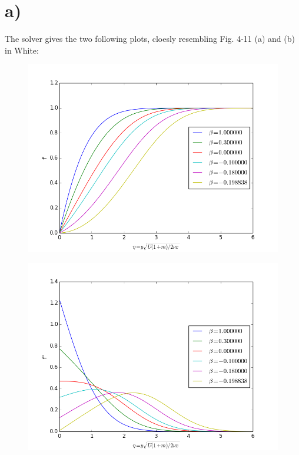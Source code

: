 \documentclass[a4paper,english,11pt,twoside]{article}
\begin{document}
\section*{a)}
The solver gives the two following plots, cloesly resembling Fig. 4-11 (a) and (b) in White:\\
\begin{figure}[h!]
\includegraphics[scale=0.6]{1a_figure_1.png}
\end{figure}
\begin{figure}[h!]
\includegraphics[scale=0.6]{1a_figure_2.png}
\end{figure}
\\
\end{document}
